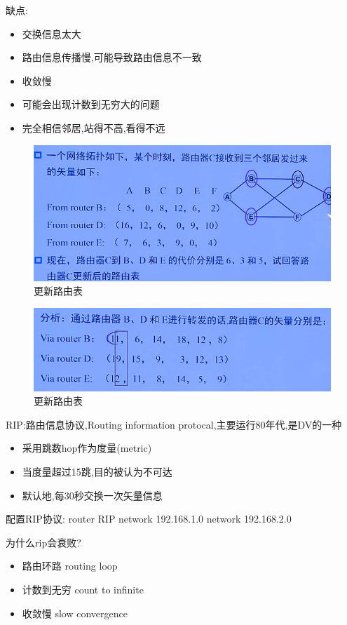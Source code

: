 \documentclass[UTF8,a4paper]{ctexart}
\begin{document}
缺点:
\begin{itemize}
  \item 交换信息太大
  \item 路由信息传播慢,可能导致路由信息不一致
  \item 收敛慢
  \item 可能会出现计数到无穷大的问题
  \item 完全相信邻居,站得不高,看得不远
\end{itemize}
\begin{figure}[H]
  \centering
  \includegraphics[scale = 0.3]{assets/jisuanjiwangluo_09224.png}
  \caption{更新路由表}
\end{figure}
\begin{figure}[H]
  \centering
  \includegraphics[scale = 0.3]{assets/jisuanjiwangluo_88905.png}
  \caption{更新路由表}
\end{figure}

RIP:路由信息协议,Routing information protocal,主要运行80年代,是DV的一种
\begin{itemize}
  \item 采用跳数hop作为度量(metric)
  \item 当度量超过15跳,目的被认为不可达
  \item 默认地,每30秒交换一次矢量信息
\end{itemize}

配置RIP协议:
router RIP
network 192.168.1.0
network 192.168.2.0

为什么rip会衰败?
\begin{itemize}
  \item 路由环路 routing loop
  \item 计数到无穷 count to infinite
  \item 收敛慢 slow convergence
\end{itemize}
\end{document}
